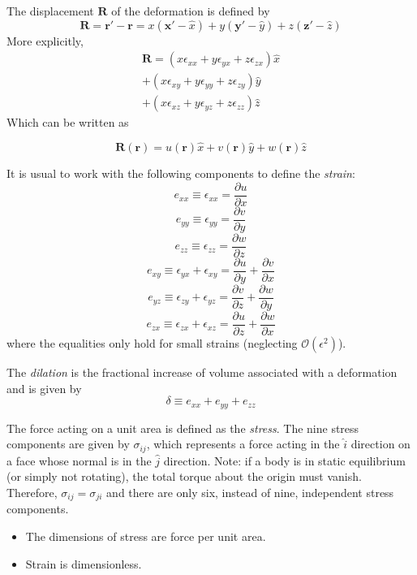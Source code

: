 \documentclass[10pt]{article}
\begin{document}
The displacement $\textbf{R}$ of the deformation is defined by
$$\textbf{R} = \textbf{r}' - \textbf{r} = x(\textbf{x}' - \hat{x}) + y(\textbf{y}' - \hat{y}) +z(\textbf{z}' - \hat{z})$$
More explicitly,
\begin{multline}
  \textbf{R} = (x\epsilon_{xx} + y\epsilon_{yx} + z\epsilon_{zx})\hat{x} \\
              + (x\epsilon_{xy} + y\epsilon_{yy} + z\epsilon_{zy})\hat{y} \\
              + (x\epsilon_{xz} + y\epsilon_{yz} + z\epsilon_{zz})\hat{z}
\end{multline}
Which can be written as

$$\textbf{R}(\textbf{r}) = u(\textbf{r})\hat{x} + v(\textbf{r})\hat{y} + w(\textbf{r})\hat{z}$$

It is usual to work with the following components to define the \emph{strain}:
$$e_{xx} \equiv \epsilon_{xx} = \frac{\partial u}{\partial x}$$
$$e_{yy} \equiv \epsilon_{yy} = \frac{\partial v}{\partial y}$$
$$e_{zz} \equiv \epsilon_{zz} = \frac{\partial w}{\partial z}$$
$$e_{xy} \equiv \epsilon_{yx} + \epsilon_{xy} = \frac{\partial u}{\partial y} + \frac{\partial v}{\partial x}$$
$$e_{yz} \equiv \epsilon_{zy} + \epsilon_{yz} = \frac{\partial v}{\partial z} + \frac{\partial w}{\partial y}$$
$$e_{zx} \equiv \epsilon_{zx} + \epsilon_{xz} = \frac{\partial u}{\partial z} + \frac{\partial w}{\partial x}$$
where the equalities only hold for small strains (neglecting $\mathcal{O}(\epsilon^{2})$).

The \emph{dilation} is the fractional increase of volume associated with a deformation and is given by
$$
\delta \equiv e_{xx} + e_{yy} + e_{zz}
$$

The force acting on a unit area is defined as the \emph{stress}. The nine stress components are given by
$\sigma_{ij}$, which represents a force acting in the $\hat{i}$ direction on a face whose normal is in the $\hat{j}$
direction. Note: if a body is in static equilibrium (or simply not rotating), the total torque about the origin must vanish.
Therefore, $\sigma_{ij} = \sigma_{ji}$ and there are only six, instead of nine, independent stress components.

\begin{itemize}
  \item The dimensions of stress are force per unit area.
  \item Strain is dimensionless. 
\end{itemize}
\end{document}
